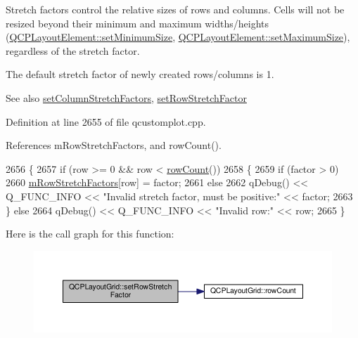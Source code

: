 Stretch factors control the relative sizes of rows and columns. Cells will not be resized beyond their minimum and maximum widths/heights (\hyperlink{class_q_c_p_layout_element_a5dd29a3c8bc88440c97c06b67be7886b}{Q\+C\+P\+Layout\+Element\+::set\+Minimum\+Size}, \hyperlink{class_q_c_p_layout_element_a74eb5280a737ab44833d506db65efd95}{Q\+C\+P\+Layout\+Element\+::set\+Maximum\+Size}), regardless of the stretch factor.

The default stretch factor of newly created rows/columns is 1.

\begin{DoxySeeAlso}{See also}
\hyperlink{class_q_c_p_layout_grid_a6c2591d1a7e2534ce036989543b49e57}{set\+Column\+Stretch\+Factors}, \hyperlink{class_q_c_p_layout_grid_a7b0273de5369bd93d942edbaf5b166ec}{set\+Row\+Stretch\+Factor} 
\end{DoxySeeAlso}


Definition at line 2655 of file qcustomplot.\+cpp.



References m\+Row\+Stretch\+Factors, and row\+Count().


\begin{DoxyCode}
2656 \{
2657   \textcolor{keywordflow}{if} (row >= 0 && row < \hyperlink{class_q_c_p_layout_grid_af8e6c7a05864ebe610c87756c7b9079c}{rowCount}())
2658   \{
2659     \textcolor{keywordflow}{if} (factor > 0)
2660       \hyperlink{class_q_c_p_layout_grid_a36c85a7eaf342680fb9b8a4977486f16}{mRowStretchFactors}[row] = factor;
2661     \textcolor{keywordflow}{else}
2662       qDebug() << Q\_FUNC\_INFO << \textcolor{stringliteral}{"Invalid stretch factor, must be positive:"} << factor;
2663   \} \textcolor{keywordflow}{else}
2664     qDebug() << Q\_FUNC\_INFO << \textcolor{stringliteral}{"Invalid row:"} << row;
2665 \}
\end{DoxyCode}


Here is the call graph for this function\+:\nopagebreak
\begin{figure}[H]
\begin{center}
\leavevmode
\includegraphics[width=350pt]{class_q_c_p_layout_grid_a7b0273de5369bd93d942edbaf5b166ec_cgraph}
\end{center}
\end{figure}



